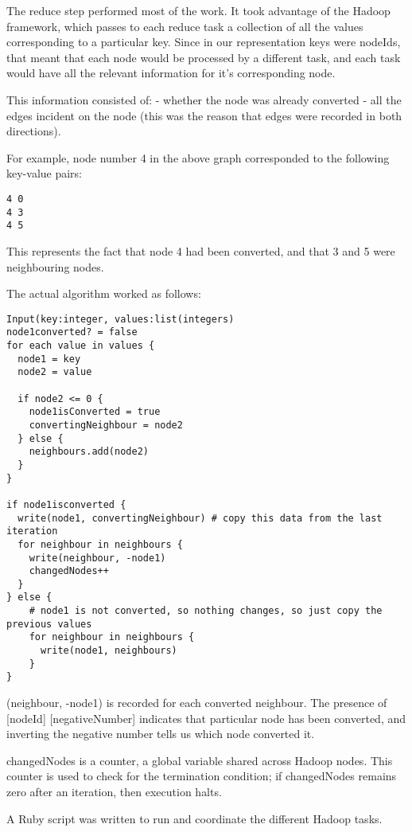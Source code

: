 The reduce step performed most of the work. It took advantage of the Hadoop framework, which passes to each reduce task a collection of all the values corresponding to a particular key. Since in our representation keys were nodeIds, that meant that each node would be processed by a different task, and each task would have all the relevant information for it's corresponding node.

This information consisted of:
- whether the node was already converted
- all the edges incident on the node (this was the reason that edges were recorded in both directions).

For example, node number 4 in the above graph corresponded to the following key-value pairs:

\begin{verbatim}
4 0
4 3
4 5
\end{verbatim}

This represents the fact that node 4 had been converted, and that 3 and 5 were neighbouring nodes.

The actual algorithm worked as follows:

\begin{verbatim}
Input(key:integer, values:list(integers)
node1converted? = false
for each value in values {
  node1 = key
  node2 = value

  if node2 <= 0 {
    node1isConverted = true
    convertingNeighbour = node2
  } else {
    neighbours.add(node2)
  }
}

if node1isconverted {
  write(node1, convertingNeighbour) # copy this data from the last iteration
  for neighbour in neighbours {
    write(neighbour, -node1)
    changedNodes++
  } 
} else {
    # node1 is not converted, so nothing changes, so just copy the previous values
    for neighbour in neighbours {
      write(node1, neighbours)
    }            
}
\end{verbatim}

(neighbour, -node1) is recorded for each converted neighbour. The presence of [nodeId] [negativeNumber] indicates that particular node has been converted, and inverting the negative number tells us which node converted it.

changedNodes is a counter, a global variable shared across Hadoop nodes. This counter is used to check for the termination condition; if changedNodes remains zero after an iteration, then execution halts.

A Ruby script was written to run and coordinate the different Hadoop tasks.

